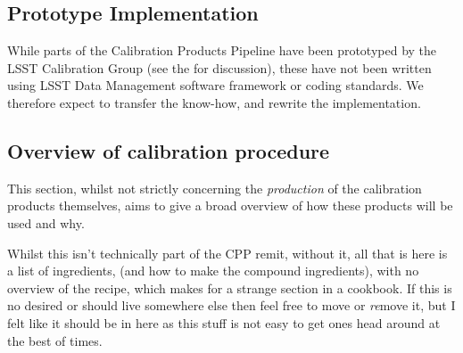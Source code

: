 \subsection{Prototype Implementation}
\label{sec:CPP:prototypeImplementation}
While parts of the Calibration Products Pipeline have been prototyped by the LSST Calibration Group (see the \NewPCP for discussion), these have not been written using LSST Data Management software framework or coding standards. We therefore expect to transfer the know-how, and rewrite the implementation.












\subsection{Overview of calibration procedure}
This section, whilst not strictly concerning the \emph{production} of the calibration products themselves, aims to give a broad overview of how these products will be used and why. 
\begin{note}
Whilst this isn't technically part of the CPP remit, without it, all that is here is a list of ingredients, (and how to make the compound ingredients), with no overview of the recipe, which makes for a strange section in a cookbook. If this is no desired or should live somewhere else then feel free to move or \emph{re}move it, but I felt like it should be in here as this stuff is not easy to get ones head around at the best of times.
\end{note}


